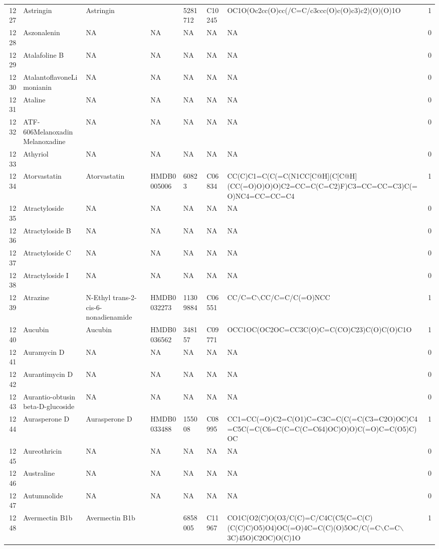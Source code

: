 \documentclass[a4paper]{article}
\begin{document}
\begin{longtable}{rlllllll}
  1227 & Astringin & Astringin &  & 5281712 & C10245 & OC1O(Oc2cc(O)cc(/C=C/c3ccc(O)c(O)c3)c2)(O)(O)1O & 1 \\ 
  1228 & Aszonalenin & NA & NA & NA & NA & NA & 0 \\ 
  1229 & Atalafoline B & NA & NA & NA & NA & NA & 0 \\ 
  1230 & AtalantoflavoneLimonianin & NA & NA & NA & NA & NA & 0 \\ 
  1231 & Ataline & NA & NA & NA & NA & NA & 0 \\ 
  1232 & ATF-606MelanoxadinMelanoxadine & NA & NA & NA & NA & NA & 0 \\ 
  1233 & Athyriol & NA & NA & NA & NA & NA & 0 \\ 
  1234 & Atorvastatin & Atorvastatin & HMDB0005006 & 60823 & C06834 & CC(C)C1=C(C(=C(N1CC[C@H](C[C@H](CC(=O)O)O)O)C2=CC=C(C=C2)F)C3=CC=CC=C3)C(=O)NC4=CC=CC=C4 & 1 \\ 
  1235 & Atractyloside & NA & NA & NA & NA & NA & 0 \\ 
  1236 & Atractyloside B & NA & NA & NA & NA & NA & 0 \\ 
  1237 & Atractyloside C & NA & NA & NA & NA & NA & 0 \\ 
  1238 & Atractyloside I & NA & NA & NA & NA & NA & 0 \\ 
  1239 & Atrazine & N-Ethyl trans-2-cis-6-nonadienamide & HMDB0032273 & 11309884 & C06551 & CC/C=C$\backslash$CC/C=C/C(=O)NCC & 1 \\ 
  1240 & Aucubin & Aucubin & HMDB0036562 & 348157 & C09771 & OCC1OC(OC2OC=CC3C(O)C=C(CO)C23)C(O)C(O)C1O & 1 \\ 
  1241 & Auramycin D & NA & NA & NA & NA & NA & 0 \\ 
  1242 & Aurantimycin D & NA & NA & NA & NA & NA & 0 \\ 
  1243 & Aurantio-obtusin beta-D-glucoside & NA & NA & NA & NA & NA & 0 \\ 
  1244 & Aurasperone D & Aurasperone D & HMDB0033488 & 155008 & C08995 & CC1=CC(=O)C2=C(O1)C=C3C=C(C(=C(C3=C2O)OC)C4=C5C(=C(C6=C(C=C(C=C64)OC)O)O)C(=O)C=C(O5)C)OC & 1 \\ 
  1245 & Aureothricin & NA & NA & NA & NA & NA & 0 \\ 
  1246 & Australine & NA & NA & NA & NA & NA & 0 \\ 
  1247 & Autumnolide & NA & NA & NA & NA & NA & 0 \\ 
  1248 & Avermectin B1b & Avermectin B1b &  & 6858005 & C11967 & CO1C(O2(C)O(O3/C(C)=C/C4C(C5(C=C(C)(C(C)C)O5)O4)OC(=O)4C=C(C)(O)5OC/C(=C$\backslash$C=C$\backslash$3C)45O)C2OC)O(C)1O & 1 \\ 

\end{longtable}
\end{document}
